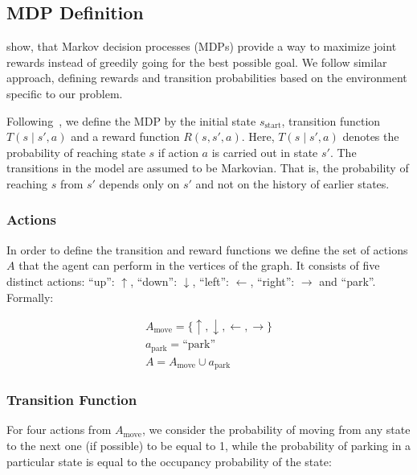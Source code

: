 
\subsection{MDP Definition} %
\label{sub:mdp_definition}

\citet{tipaldiICRA11} show, that Markov decision processes (MDPs) provide a
way to maximize joint rewards instead of greedily going for the best possible
goal. We follow similar approach, defining rewards and transition
probabilities based on the environment specific to our problem.

Following~\citet{bellman1957}, we define the MDP by the initial state
$s_\mathrm{start}$, transition function $T(s \mid s', a)$ and a reward
function $R(s, s', a)$. Here, $T(s \mid s', a)$ denotes the probability of
reaching state $s$ if action $a$ is carried out in state $s'$. The transitions
in the model are assumed to be Markovian. That is, the probability of reaching
$s$ from $s'$ depends only on $s'$ and not on the history of earlier states.

\subsubsection{Actions} %
\label{sub:actions}

In order to define the transition and reward functions we define the set of
actions $A$ that the agent can perform in the vertices of the graph. It
consists of five distinct actions: ``up'': $\uparrow$, ``down'': $\downarrow$,
``left'': $\leftarrow$, ``right'': $\rightarrow$ and ``park''. Formally:

\begin{eqnarray}
A_{\mathrm{move}} = \{ \uparrow, \downarrow, \leftarrow, \rightarrow \} \\
a_{\mathrm{park}} = \mbox{``park''} \\
A = A_{\mathrm{move}} \cup a_{\mathrm{park}}
\label{eq:actions}
\end{eqnarray}



\subsubsection{Transition Function} %
\label{ssub:transition_function}

For four actions from $A_\mathrm{move}$, we consider the probability of moving
from any state to the next one (if possible) to be equal to 1, while the
probability of parking in a particular state is equal to the occupancy
probability of the state:

